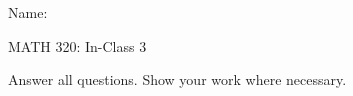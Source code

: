\documentclass{article}
\begin{document}
\hspace{375pt}Name:

\begin{center}
{\Huge MATH 320: In-Class 3}
 
\end{center}

\bigskip\bigskip

Answer all questions. Show your work where necessary.\bigskip

\end{document}
